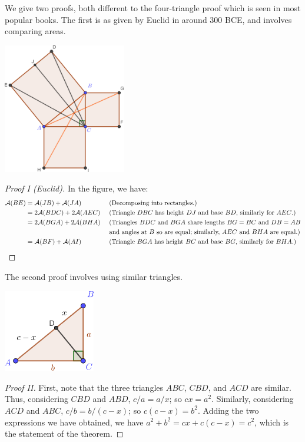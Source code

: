 \documentclass[a4paper,leqno]{article}
\numberwithin{equation}{section}
\theoremstyle{definition}
\theoremstyle{remark}
\begin{document}
We give two proofs, both different to the four-triangle proof which is seen in most popular books. The first is as given by Euclid in
around 300 BCE, and involves comparing areas.
\begin{center}
  \includegraphics[width=0.4\textwidth]{pythag2}
\end{center}
\begin{proof}[Proof I (Euclid)]
  In the figure, we have:
  \begin{align*}
    \mathcal{A}(BE) &= \mathcal{A}(JB) + \mathcal{A}(JA) && \text{ (Decomposing into rectangles.)}\\
                    &= 2\mathcal{A}(BDC) + 2\mathcal{A}(AEC) && \text{ (Triangle $ DBC $ has height $ DJ $ and base $BD $, similarly for $ AEC $.)}\\
                    &= 2\mathcal{A}(BGA) + 2\mathcal{A}(BHA) && \text{ (Triangles $ BDC $ and $ BGA $ share lengths $ BG = BC $ and $ DB = AB $}\\
                    &                                        && \text{ and angles at $ B $ so are equal; similarly, $ AEC $ and $ BHA $ are equal.)}\\
                    &= \mathcal{A}(BF) + \mathcal{A}(AI) && \text{ (Triangle $ BGA $ has height $ BC $ and base $ BG $, similarly for $ BHA $.)}
  \end{align*}
\end{proof}

The second proof involves using similar triangles.
\begin{center}
  \includegraphics[width=0.3\textwidth]{pythag3}
\end{center}
\begin{proof}[Proof II]
  First, note that the three triangles $ ABC $, $ CBD $, and $ ACD $ are similar. Thus, considering $ CBD $ and $ ABD $, $ c/a = a/x $; so $ cx = a^2 $.
  Similarly, considering $ ACD $ and $ ABC $, $ c/b = b/(c - x) $; so $ c(c - x) = b^2 $. Adding the two expressions we have obtained, we
  have $ a^2 + b^2 = cx + c(c - x) = c^2 $, which is the statement of the theorem.
\end{proof}
\end{document}
